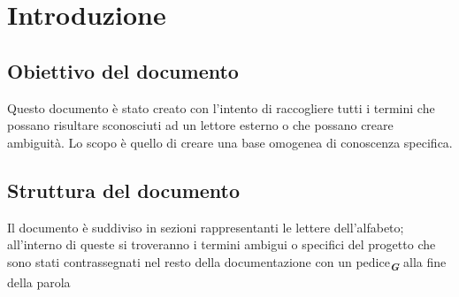 


\section*{Introduzione}

\subsection*{Obiettivo del documento}
Questo documento è stato creato con l’intento di raccogliere tutti i termini che possano risultare sconosciuti ad un lettore esterno o che possano creare 
ambiguità. Lo scopo è quello di creare una base omogenea di conoscenza specifica.

\subsection*{Struttura del documento}
Il documento è suddiviso in sezioni rappresentanti le lettere dell’alfabeto; all’interno di queste si troveranno i termini ambigui o specifici del progetto 
che sono stati contrassegnati nel resto della documentazione con un pedice\textsubscript{\textit{\textbf{G}}} alla fine della parola
